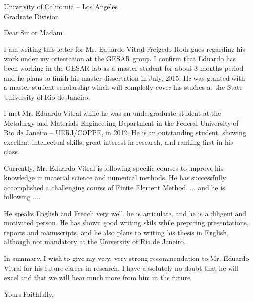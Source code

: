 \documentclass{letter}
\begin{document}
\begin{letter}{University of California -- Los Angeles \\
               Graduate Division
}
\opening{Dear Sir or Madam:}

I am writing this letter for Mr. Eduardo Vitral Freigedo Rodrigues
regarding his work under my orientation at the GESAR group. I confirm
that Eduardo has been working in the GESAR lab as a master student for
about 3 months period and he plans to finish his master dissertation in
July, 2015. He was granted with a master student scholarship which will
completly cover his studies at the State University of Rio de
Janeiro.

I met Mr. Eduardo Vitral while he was an undergraduate student at the
Metalurgy and Materials Engineering Department in the Federal University
of Rio de Janeiro -- UERJ/COPPE, in 2012. He is an outstanding student,
showing excellent intellectual skills, great interest in research, and
ranking first in his class.

Currently, Mr. Eduardo Vitral is following specific courses to improve
his knowledge in material science and numerical methods. He has
successfully accomplished a challenging course of Finite Element Method,
... and he is following ....

He speaks English and French very well, he is articulate, and he is a
diligent and motivated person. He has shown good writing skils while
preparing presentations, reports and manuscripts, and he also plans to
writing his thesis in English, although not mandatory at the University
of Rio de Janeiro.

In summary, I wish to give my very, very strong recommendation to Mr.
Eduardo Vitral for his future career in research. I have absolutely no
doubt that he will excel and that we will hear much more from him in the
future.


\closing{Yours Faithfully,}

\end{letter}
\end{document}
